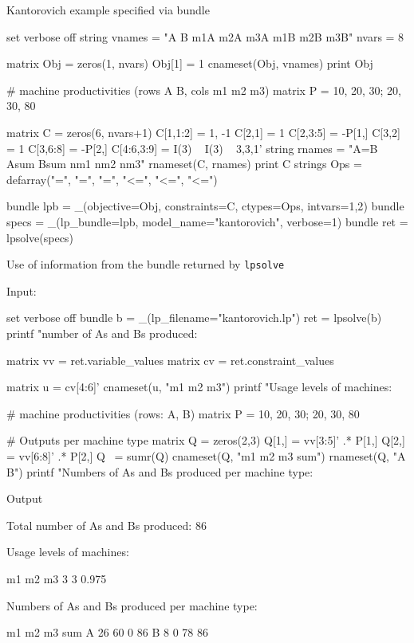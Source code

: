 \documentclass{article}
\begin{document}
\begin{script}[htbp]
  \caption{Kantorovich example specified via bundle}
  \label{ls:kantor-bundle}
\begin{scode}
set verbose off
string vnames = "A B m1A m2A m3A m1B m2B m3B"
nvars = 8

matrix Obj = zeros(1, nvars)
Obj[1] = 1
cnameset(Obj, vnames)
print Obj

# machine productivities (rows A B, cols m1 m2 m3)
matrix P = {10, 20, 30; 20, 30, 80}

matrix C = zeros(6, nvars+1)
C[1,1:2] = {1, -1}
C[2,1] = 1
C[2,3:5] = -P[1,]
C[3,2] = 1
C[3,6:8] = -P[2,]
C[4:6,3:9] = I(3) ~ I(3) ~ {3,3,1}'
string rnames = "A=B Asum Bsum nm1 nm2 nm3"
rnameset(C, rnames)
print C
strings Ops = defarray("=", "=", "=", "<=", "<=", "<=")

bundle lpb = _(objective=Obj, constraints=C, ctypes=Ops, intvars={1,2})
bundle specs = _(lp_bundle=lpb, model_name="kantorovich", verbose=1)
bundle ret = lpsolve(specs)
\end{scode}
\end{script}

\begin{script}[htbp]
  \caption{Use of information from the bundle returned by \texttt{lpsolve}}
  \label{ls:kantor-analysis}
Input:
\begin{scode}
set verbose off
bundle b = _(lp_filename="kantorovich.lp")
ret = lpsolve(b)
printf "\nTotal number of As and Bs produced: %

matrix vv = ret.variable_values
matrix cv = ret.constraint_values

matrix u = cv[4:6]'
cnameset(u, "m1 m2 m3")
printf "Usage levels of machines:\n\n%

# machine productivities (rows: A, B)
matrix P = {10, 20, 30; 20, 30, 80}

# Outputs per machine type
matrix Q = zeros(2,3)
Q[1,] = vv[3:5]' .* P[1,]
Q[2,] = vv[6:8]' .* P[2,]
Q ~= sumr(Q)
cnameset(Q, "m1 m2 m3 sum")
rnameset(Q, "A B")
printf "Numbers of As and Bs produced per machine type:\n\n%
\end{scode}
Output
\begin{scode}
Total number of As and Bs produced: 86

Usage levels of machines:

      m1      m2      m3
       3       3   0.975

Numbers of As and Bs produced per machine type:

      m1    m2    m3   sum
A     26    60     0    86
B      8     0    78    86
\end{scode}
\end{script}



\end{document}
